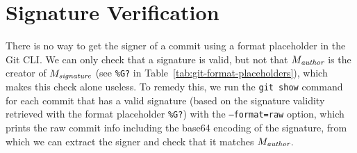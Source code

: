 
\section{Signature Verification}
There is no way to get the signer of a commit using a format placeholder in the Git CLI. We can only check that a signature is valid, but not that $M_\emph{author}$ is the creator of $M_\emph{signature}$ (see \texttt{\%G?} in Table~\ref{tab:git-format-placeholders}), which makes this check alone useless. To remedy this, we run the \texttt{git show} command for each commit that has a valid signature (based on the signature validity retrieved with the format placeholder \texttt{\%G?}) with the \texttt{--format=raw} option, which prints the raw commit info including the base64 encoding of the signature, from which we can extract the signer and check that it matches $M_\emph{author}$.

